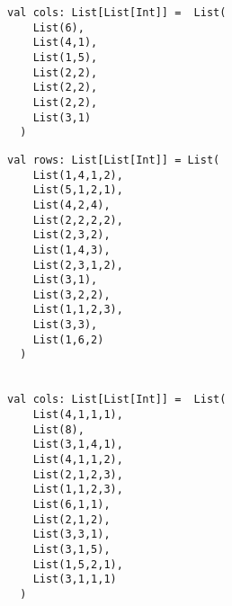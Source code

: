 \documentclass{article}
\begin{document}
\begin{spacing}{1.2}
\begin{lstlisting}
val cols: List[List[Int]] =  List(
    List(6),
    List(4,1),
    List(1,5),
    List(2,2),
    List(2,2),
    List(2,2),
    List(3,1)
  )
\end{lstlisting}\newpage
\begin{lstlisting}
val rows: List[List[Int]] = List(
    List(1,4,1,2),
    List(5,1,2,1),
    List(4,2,4),
    List(2,2,2,2),
    List(2,3,2),
    List(1,4,3),
    List(2,3,1,2),
    List(3,1),
    List(3,2,2),
    List(1,1,2,3),
    List(3,3),
    List(1,6,2)
  )


val cols: List[List[Int]] =  List(
    List(4,1,1,1),
    List(8),
    List(3,1,4,1),
    List(4,1,1,2),
    List(2,1,2,3),
    List(1,1,2,3),
    List(6,1,1),
    List(2,1,2),
    List(3,3,1),
    List(3,1,5),
    List(1,5,2,1),
    List(3,1,1,1)
  )
 \end{lstlisting}

\end{spacing}
\end{document}
